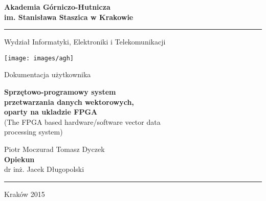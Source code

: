 \begin{titlepage}
    \begin{center}
		\fontsize{17pt}{20pt}\selectfont
        \textbf{Akademia Górniczo-Hutnicza\\im. Stanisława Staszica w Krakowie}
        \rule{\textwidth}{1.5pt}\par
        \vspace{0.5cm}
        Wydział Informatyki, Elektroniki i Telekomunikacji
        
        \vspace{1.5cm}

        \texttt{[image: images/agh]}

 		Dokumentacja użytkownika
 		
 		\vspace{0.5cm}
	 	\textbf{Sprzętowo-programowy system\\przetwarzania danych wektorowych,\\oparty na ukladzie FPGA}\\
		(The FPGA based hardware/software vector data\\ processing system)
		
		\vspace{0.5cm}

		Piotr Moczurad \hspace{2cm}
		Tomasz Dyczek
		\vspace{0.5cm}\\
		\textbf{Opiekun}\\
		dr inż. Jacek Długopolski
		\rule{\textwidth}{1.5pt}\par
		Kraków 2015
		
        
    \end{center}
\end{titlepage}